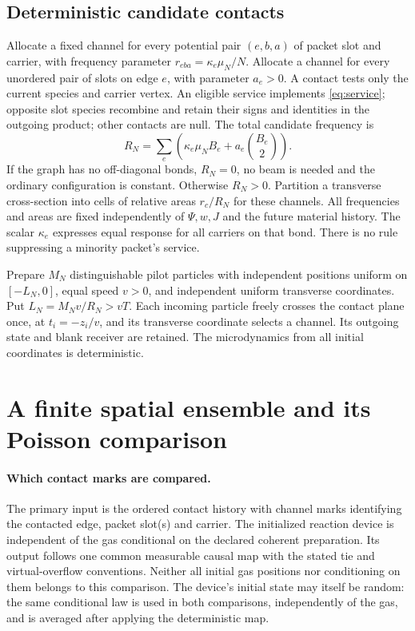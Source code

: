\documentclass[11pt]{article}
\theoremstyle{definition}\newtheorem{definition}[theorem]{Definition}
\theoremstyle{remark}\newtheorem{remark}[theorem]{Remark}
\begin{document}
\subsection{Deterministic candidate contacts}
Allocate a fixed channel for every potential pair $(e,b,a)$ of packet slot and carrier, with frequency parameter $r_{eba}=\kappa_e\mu_N/N$. Allocate a channel for every unordered pair of slots on edge $e$, with parameter $a_e>0$. A contact tests only the current species and carrier vertex. An eligible service implements \eqref{eq:service}; opposite slot species recombine and retain their signs and identities in the outgoing product; other contacts are null. The total candidate frequency is
\begin{equation}
 R_N=\sum_e\left(\kappa_e\mu_NB_e+a_e\binom{B_e}{2}\right).
 \label{eq:candidate}
\end{equation}
If the graph has no off-diagonal bonds, $R_N=0$, no beam is needed and the ordinary configuration is constant. Otherwise $R_N>0$. Partition a transverse cross-section into cells of relative areas $r_c/R_N$ for these channels. All frequencies and areas are fixed independently of $\Psi,w,J$ and the future material history. The scalar $\kappa_e$ expresses equal response for all carriers on that bond. There is no rule suppressing a minority packet's service.

Prepare $M_N$ distinguishable pilot particles with independent positions uniform on $[-L_N,0]$, equal speed $v>0$, and independent uniform transverse coordinates. Put $L_N=M_Nv/R_N>vT$. Each incoming particle freely crosses the contact plane once, at $t_i=-z_i/v$, and its transverse coordinate selects a channel. Its outgoing state and blank receiver are retained. The microdynamics from all initial coordinates is deterministic.

\section{A finite spatial ensemble and its Poisson comparison}\label{sec:gas}
\paragraph{Which contact marks are compared.}
The primary input is the ordered contact history with channel marks
identifying the contacted edge, packet slot(s) and carrier.  The initialized
reaction device is independent of the gas conditional on the declared
coherent preparation.  Its output follows one common measurable causal
map with the stated tie and virtual-overflow conventions.  Neither all
initial gas positions nor conditioning on them belongs to this comparison.
The device's initial state may itself be random: the same conditional
law is used in both comparisons, independently of the gas, and is
averaged after applying the deterministic map.
\end{document}
